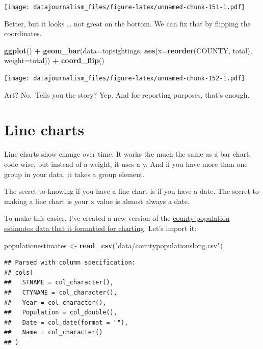 \documentclass[]{book}
\newenvironment{Shaded}{\begin{snugshade}}{\end{snugshade}}
\newcommand{\DataTypeTok}[1]{\textcolor[rgb]{0.13,0.29,0.53}{#1}}
\newcommand{\KeywordTok}[1]{\textcolor[rgb]{0.13,0.29,0.53}{\textbf{#1}}}
\newcommand{\NormalTok}[1]{#1}
\newcommand{\OperatorTok}[1]{\textcolor[rgb]{0.81,0.36,0.00}{\textbf{#1}}}
\newcommand{\StringTok}[1]{\textcolor[rgb]{0.31,0.60,0.02}{#1}}
\begin{document}
\texttt{[image: datajournalism\_files/figure-latex/unnamed-chunk-151-1.pdf]}

Better, but it looks \ldots{} not great on the bottom. We can fix that by flipping the coordinates.

\begin{Shaded}
\begin{Highlighting}[]
\KeywordTok{ggplot}\NormalTok{() }\OperatorTok{+}\StringTok{ }\KeywordTok{geom_bar}\NormalTok{(}\DataTypeTok{data=}\NormalTok{topsightings, }\KeywordTok{aes}\NormalTok{(}\DataTypeTok{x=}\KeywordTok{reorder}\NormalTok{(COUNTY, total), }\DataTypeTok{weight=}\NormalTok{total)) }\OperatorTok{+}\StringTok{ }\KeywordTok{coord_flip}\NormalTok{()}
\end{Highlighting}
\end{Shaded}

\texttt{[image: datajournalism\_files/figure-latex/unnamed-chunk-152-1.pdf]}

Art? No.~Tells you the story? Yep. And for reporting purposes, that's enough.

\hypertarget{line-charts}{%
\section{Line charts}\label{line-charts}}

Line charts show change over time. It works the much the same as a bar chart, code wise, but instead of a weight, it uses a y. And if you have more than one group in your data, it takes a group element.

The secret to knowing if you have a line chart is if you have a date. The secret to making a line chart is your x value is almost always a date.

To make this easier, I've created a new version of the \href{https://unl.box.com/s/v4d3uyteuzhxqjl3nfn9f5lhe16a2fq4}{county population estimates data that it formatted for charting}. Let's import it:

\begin{Shaded}
\begin{Highlighting}[]
\NormalTok{populationestimates <-}\StringTok{ }\KeywordTok{read_csv}\NormalTok{(}\StringTok{"data/countypopulationslong.csv"}\NormalTok{)}
\end{Highlighting}
\end{Shaded}

\begin{verbatim}
## Parsed with column specification:
## cols(
##   STNAME = col_character(),
##   CTYNAME = col_character(),
##   Year = col_character(),
##   Population = col_double(),
##   Date = col_date(format = ""),
##   Name = col_character()
## )
\end{verbatim}
\end{document}
